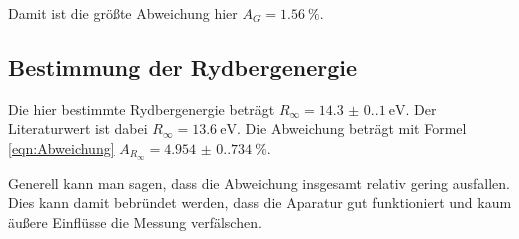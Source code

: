 Damit ist die größte Abweichung hier $A_G=\qty{1.56}{\percent}$.

\subsection{Bestimmung der Rydbergenergie}
Die hier bestimmte Rydbergenergie beträgt $R_{\infty}=\qty{14.3(0.1)}{\electronvolt}$.
Der Literaturwert ist dabei $R_{\infty}=\qty{13.6}{\electronvolt}$.
Die Abweichung beträgt mit Formel \ref{eqn:Abweichung} $A_{R_{\infty}}=\qty{4.954(0.734)}{\percent}$.

\noindent Generell kann man sagen, dass die Abweichung insgesamt relativ gering ausfallen.
Dies kann damit bebründet werden, dass die Aparatur gut funktioniert und kaum äußere Einflüsse die Messung verfälschen.